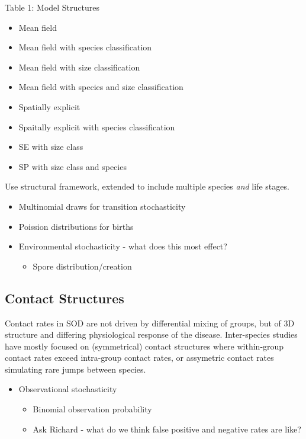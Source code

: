 \documentclass[english,nohyper,nofonts,nobib,nols,twoside]{tufte-handout}
\let\oldcitet\citet
\renewcommand{\citet}[1]{\oldcitet{#1}\cite{#1}}
\begin{document}
Table 1: Model Structures

\begin{itemize}
\itemsep1pt\parskip0pt
\item
  Mean field
\item
  Mean field with species classification
\item
  Mean field with size classification
\item
  Mean field with species and size classification
\item
  Spatially explicit
\item
  Spaitally explicit with species classification
\item
  SE with size class
\item
  SP with size class and species
\end{itemize}

Use \citet{Klepac2010} structural framework, extended to include
multiple species \emph{and} life stages.

\begin{itemize}
\itemsep1pt\parskip0pt
\item
  Multinomial draws for transition stochasticity
\item
  Poission distributions for births
\item
  Environmental stochasticity - what does this most effect?

  \begin{itemize}
  \itemsep1pt\parskip0pt
  \item
    Spore distribution/creation
  \end{itemize}
\end{itemize}

\subsection{Contact Structures}

Contact rates in SOD are not driven by differential mixing of groups,
but of 3D structure and differing physiological response of the disease.
Inter-species studies have mostly focused on (symmetrical) contact
structures where within-group contact rates exceed intra-group contact
rates, or assymetric contact rates simulating rare jumps between
species.

\begin{itemize}
\itemsep1pt\parskip0pt
\item
  Observational stochasticity

  \begin{itemize}
  \itemsep1pt\parskip0pt
  \item
    Binomial observation probability
  \item
    Ask Richard - what do we think false positive and negative rates are
    like?
  \end{itemize}
\end{itemize}
\end{document}

